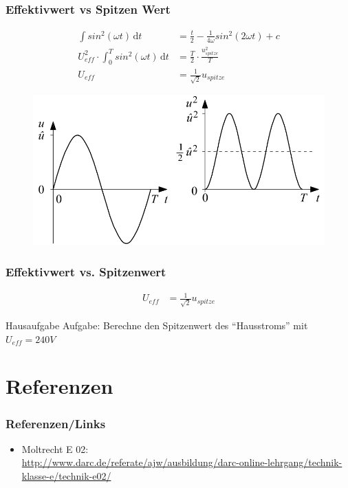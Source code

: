 \begin{frame}
  \frametitle{Effektivwert vs Spitzen Wert}
  \begin{align}
    \int \! sin^2(\omega t) \, \mathrm{d}t & = \frac{t}{2} - \frac{1}{4\omega}sin^2(2\omega t) + c \\
    U_{eff}^2 \cdot \int_0^T \! sin^2(\omega t) \, \mathrm{d}t & = \frac{T}{2} \cdot \frac{u_{spitze}^2}{T} \\
    U_{eff} & = \frac{1}{\sqrt{2}} u_{spitze}
  \end{align}
  \begin{center}
    \begin{figure}
      \includegraphics[width=.6\textwidth,height=.3\textheight,keepaspectratio]{e02/EffektivwertSinus.png}\\
    \end{figure}
  \end{center}
\end{frame}

\begin{frame}
    \frametitle{Effektivwert vs. Spitzenwert}
    \begin{align} 
		U_{eff} & = \frac{1}{\sqrt{2}} u_{spitze}
	\end{align}
	\begin{alertblock}{Hausaufgabe}
	    Aufgabe: Berechne den Spitzenwert des ``Hausstroms'' mit $U_{eff} = 240V$
	\end{alertblock}
\end{frame}

\section*{Referenzen}

\begin{frame}
    \frametitle{Referenzen/Links}
    
    \footnotesize
    \begin{itemize}
        \item Moltrecht E 02: \\
              \url{http://www.darc.de/referate/ajw/ausbildung/darc-online-lehrgang/technik-klasse-e/technik-e02/}
    \end{itemize}

\end{frame}

